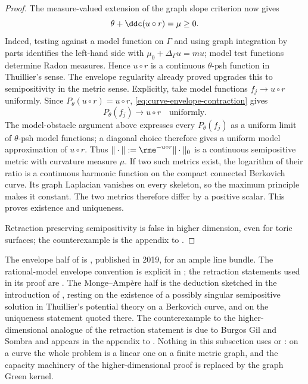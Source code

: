 \begin{proof}
The measure-valued extension of the graph slope criterion now gives
\[
 \theta+\ddc(u\circ r)=\mu\geq0.
\]
Indeed, testing against a model function on $\Gamma$ and using graph
integration by parts identifies the left-hand side with
$\mu_0+\Delta_\Gamma u=mu$; model test functions determine Radon
measures.  Hence $u\circ r$ is a continuous $\theta$-psh function in
Thuillier's sense.  The envelope regularity already proved upgrades this to
semipositivity in the metric sense.  Explicitly, take model functions
$f_j\to u\circ r$ uniformly.  Since $P_\theta(u\circ r)=u\circ r$,
\eqref{eq:curve-envelope-contraction} gives
\[
 P_\theta(f_j)\longrightarrow u\circ r
 \quad\text{uniformly}.
\]
The model-obstacle argument above expresses every $P_\theta(f_j)$ as a
uniform limit of $\theta$-psh model functions; a diagonal choice therefore
gives a uniform model approximation of $u\circ r$.  Thus
$\|\cdot\|:=\rme^{-u\circ r}\|\cdot\|_0$ is a continuous semipositive
metric with curvature measure $\mu$.
If two such metrics exist, the logarithm of their ratio is a continuous
harmonic function on the compact connected Berkovich curve.  Its graph
Laplacian vanishes on every skeleton, so the maximum principle makes it
constant.  The two metrics therefore differ by a positive scalar.  This
proves existence and uniqueness.

Retraction preserving semipositivity is false in higher dimension, even for
toric surfaces; the counterexample is the appendix to \cite{GJKM19}.
\end{proof}

\begin{remark}
\label{rem:ch29-curve-source}
The envelope half of  is
\cite[Theorem~1.1]{GJKM19}, published in 2019, for an ample line bundle.
The rational-model envelope convention is explicit in
; the retraction statements used in its proof are
\cite[Proposition~1.2 and Propositions~3.5, 3.8]{GJKM19}.  The
Monge--Amp\`ere half is the deduction sketched in the introduction of
\cite{GJKM19}, resting on the existence of a possibly singular semipositive
solution in Thuillier's potential theory on a Berkovich curve, and on the
uniqueness statement quoted there.  The counterexample to the
higher-dimensional analogue of the retraction statement is due to Burgos Gil
and Sombra and appears in the appendix to \cite{GJKM19}.  Nothing in this
subsection uses  or : on a
curve the whole problem is a linear one on a finite metric graph, and the
capacity machinery of the higher-dimensional proof is replaced by the graph
Green kernel.
\end{remark}

